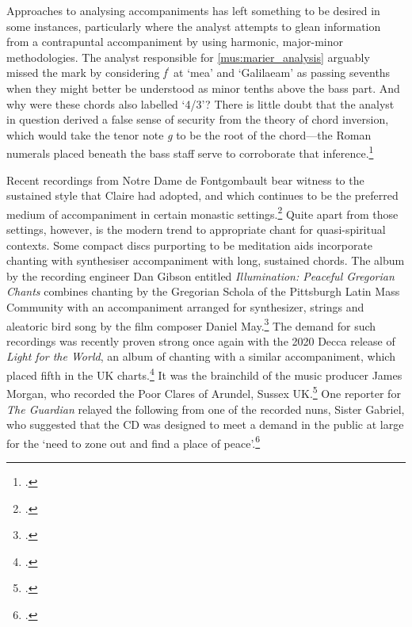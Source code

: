 %
Approaches to analysing accompaniments has left something to be desired in some instances, particularly where the analyst attempts to glean information from a contrapuntal accompaniment by using harmonic, major-minor methodologies.
The analyst responsible for \cref{mus:marier_analysis} arguably missed the mark by considering \emph{f}$^\prime$ at `mea' and `Galilaeam' as passing sevenths when they might better be understood as minor tenths above the bass part.
And why were these chords also labelled `4/3'?
There is little doubt that the analyst in question derived a false sense of security from the theory of chord inversion, which would take the tenor note \emph{g} to be the root of the chord---the Roman numerals placed beneath the bass staff serve to corroborate that inference.\footcite[144, 148]{AtwoodInfluencePlainchantLiturgical2014}
%

Recent recordings from Notre Dame de Fontgombault bear witness to the sustained style that Claire had adopted, and which continues to be the preferred medium of accompaniment in certain monastic settings.\footcite{TheAbbeyofNotreDameIntroitBenedictaSit2001}
Quite apart from those settings, however, is the modern trend to appropriate chant for quasi-spiritual contexts.
Some compact discs purporting to be meditation aids incorporate chanting with synthesiser accompaniment with long, sustained chords.
The album by the recording engineer Dan Gibson entitled \emph{Illumination: Peaceful Gregorian Chants} combines chanting by the Gregorian Schola of the Pittsburgh Latin Mass Community with an accompaniment arranged for synthesizer, strings and aleatoric bird song by the film composer Daniel May.\footcite{GibsonIntroit2014}
The demand for such recordings was recently proven strong once again with the 2020 Decca release of \emph{Light for the World}, an album of chanting with a similar accompaniment, which placed fifth in the UK charts.\footcite{LightWorld}
It was the brainchild of the music producer James Morgan, who recorded the Poor Clares of Arundel, Sussex UK.\footcite{ArundelPangeLingua2020}
One reporter for \emph{The Guardian} relayed the following from one of the recorded nuns, Sister Gabriel, who suggested that the CD was designed to meet a demand in the public at large for the `need to zone out and find a place of peace'.\footcite{MoorheadSwingoutsisters2020}

